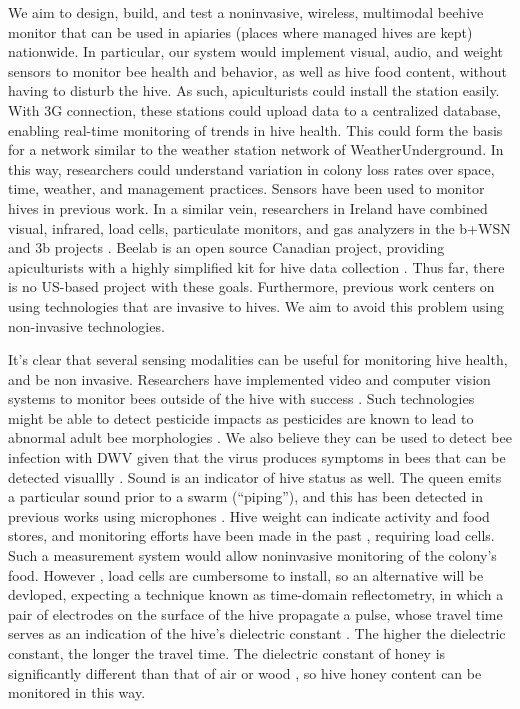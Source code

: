 We aim to design, build, and test a noninvasive, wireless, multimodal beehive monitor that can be used in apiaries (places where managed hives are kept) nationwide. In particular, our system would implement visual, audio, and weight sensors to monitor bee health and behavior, as well as hive food content, without having to disturb the hive. As such, apiculturists could install the station easily. With 3G connection, these stations could upload data to a centralized database, enabling real-time monitoring of trends in hive health. This could form the basis for a network similar to the weather station network of WeatherUnderground. In this way, researchers could understand variation in colony loss rates over space, time, weather, and management practices. Sensors have been used to monitor hives in previous work. In a similar vein, researchers in Ireland have combined visual, infrared, load cells, particulate monitors, and gas analyzers in the b+WSN and 3b projects \cite{murphy2015big, murphy2015b+wsn}. Beelab is an open source Canadian project, providing apiculturists with a highly simplified kit for hive data collection \cite{phillips2014testing}. Thus far, there is no US-based project with these goals. Furthermore, previous work centers on using technologies that are invasive to hives. We aim to avoid this problem using non-invasive technologies.

It's clear that several sensing modalities can be useful for monitoring hive health, and be non invasive. Researchers have implemented video and computer vision systems to monitor bees outside of the hive with success \cite{azarcoya2014automatic,steen2011portable}. Such technologies might be able to detect pesticide impacts as pesticides are known to lead to abnormal adult bee morphologies \cite{speybroeck2010weighing}. We also believe they can be used to detect bee infection with DWV given that the virus produces symptoms in bees that can be detected visuallly \cite{de2010deformed}. Sound is an indicator of hive status as well. The queen emits a particular sound prior to a swarm (“piping”), and this has been detected in previous works using microphones \cite{ferrari2008monitoring, eren1997electronic}. Hive weight can indicate activity and food stores, and monitoring efforts have been made in the past \cite{meikle2008within}, requiring load cells. Such a measurement system would allow noninvasive monitoring of the colony's food. However , load cells are cumbersome to install, so an alternative will be devloped, expecting a technique known as time-domain reflectometry, in which a pair of electrodes on the surface of the hive propagate a pulse, whose travel time serves as an indication of the hive's dielectric constant \cite{dalton1984time}. The higher the dielectric constant, the longer the travel time. The dielectric constant of honey is significantly different than that of air or wood \cite{guo2010sugar}, so hive honey content can be monitored in this way.


